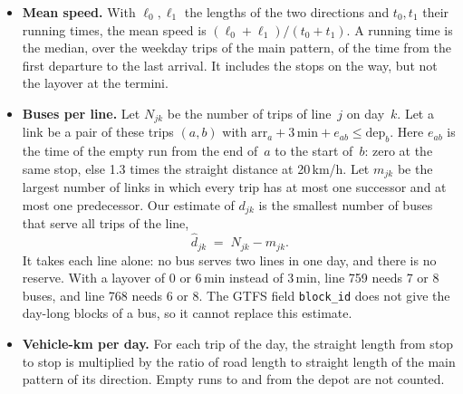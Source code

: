 \documentclass[11pt,a4paper]{article}
\theoremstyle{plain}
\theoremstyle{definition}
\theoremstyle{remark}
\begin{document}
\begin{itemize}
    We resample every 20\,m and smooth by a moving average over 100\,m.
    The ascent of a direction is the sum of its rises, and the steepest grade is the largest height change over 100\,m of road.
    The height model gives the terrain, not the road deck, so bridges and underpasses give false steps; grades above about 8\,\% need a check on a map.
  \item \textbf{Mean speed.} With $\ell_0, \ell_1$ the lengths of the two directions and $t_0, t_1$ their running times, the mean speed is $(\ell_0+\ell_1)/(t_0+t_1)$.
    A running time is the median, over the weekday trips of the main pattern, of the time from the first departure to the last arrival.
    It includes the stops on the way, but not the layover at the termini.
  \item \textbf{Buses per line.} Let $N_{jk}$ be the number of trips of line~$j$ on day~$k$.
    Let a link be a pair of these trips $(a,b)$ with $\mathrm{arr}_a + 3\,\mathrm{min} + e_{ab} \le \mathrm{dep}_b$.
    Here $e_{ab}$ is the time of the empty run from the end of~$a$ to the start of~$b$: zero at the same stop, else 1.3 times the straight distance at 20\,km/h.
    Let $m_{jk}$ be the largest number of links in which every trip has at most one successor and at most one predecessor.
    Our estimate of $d_{jk}$ is the smallest number of buses that serve all trips of the line,
    \begin{equation}\label{eq:cs_buses}
      \hat d_{jk} \;=\; N_{jk} - m_{jk}.
    \end{equation}
    It takes each line alone: no bus serves two lines in one day, and there is no reserve.
    With a layover of 0 or 6\,min instead of 3\,min, line 759 needs 7 or 8 buses, and line 768 needs 6 or 8.
    The GTFS field \texttt{block\_id} does not give the day-long blocks of a bus, so it cannot replace this estimate.
  \item \textbf{Vehicle-km per day.} For each trip of the day, the straight length from stop to stop is multiplied by the ratio of road length to straight length of the main pattern of its direction.
    Empty runs to and from the depot are not counted.
\end{itemize}
\end{document}
